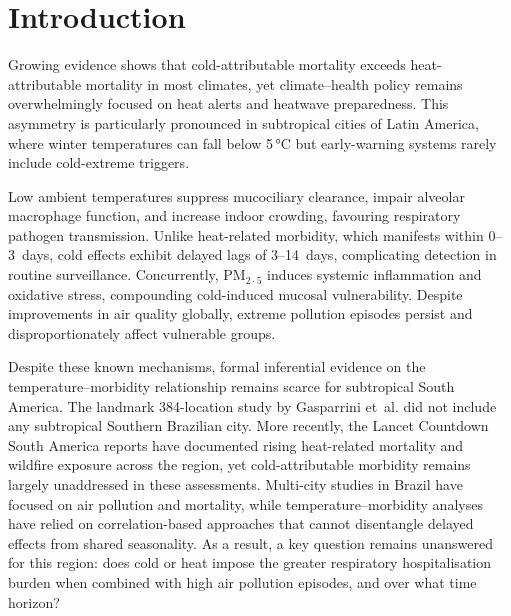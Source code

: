 \documentclass[review,number]{elsarticle}
\begin{document}
\section{Introduction}

Growing evidence shows that cold-attributable mortality
exceeds heat-attributable mortality in most
climates,\cite{Gasparrini2015} yet climate--health policy remains
overwhelmingly focused on heat alerts and heatwave preparedness.
This asymmetry is particularly pronounced in subtropical cities of
Latin America, where winter temperatures can fall below
5\,°C but early-warning systems rarely include cold-extreme
triggers.\cite{Bell2024,McMichael2006}

Low ambient temperatures suppress mucociliary clearance, impair
alveolar macrophage function, and increase indoor crowding, favouring
respiratory pathogen transmission.\cite{Linares2025} Unlike
heat-related morbidity, which manifests within 0--3~days, cold effects
exhibit delayed lags of 3--14~days, complicating detection in routine
surveillance.\cite{Ebi2021,Cheng2024} Concurrently,
$\text{PM}_{2{\cdot}5}$ induces systemic inflammation and oxidative stress,
compounding cold-induced mucosal vulnerability.\cite{Brook2010}
Despite improvements in air quality
globally,\cite{Yu2025,Gopikrishnan2025} extreme pollution episodes
persist and disproportionately affect vulnerable
groups.\cite{Hertzog2024,Requia2024,Nashwan2024}

Despite these known mechanisms, formal inferential evidence on the
temperature--morbidity relationship remains scarce for subtropical
South America. The landmark 384-location study by Gasparrini
et~al.\cite{Gasparrini2015} did not include any subtropical Southern
Brazilian city. More recently, the Lancet Countdown South America
reports have documented rising heat-related mortality and wildfire
exposure across the region,\cite{LancetCountdownSA2025} yet
cold-attributable morbidity remains largely unaddressed in these
assessments. Multi-city studies in Brazil have focused on air
pollution and mortality,\cite{Requia2024} while temperature--morbidity
analyses have relied on correlation-based approaches that cannot
disentangle delayed effects from shared seasonality. As a result,
a key question remains unanswered for this region: does cold
or heat impose the greater respiratory hospitalisation burden when
combined with high air pollution episodes, and over what time horizon?
\end{document}
